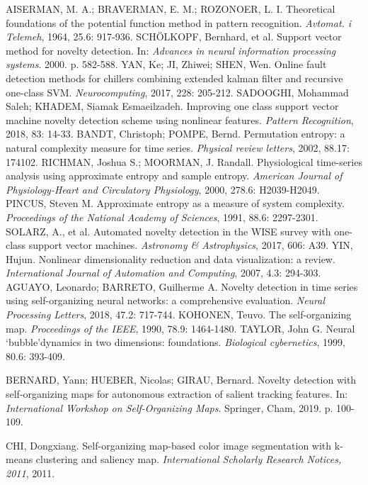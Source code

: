 \documentclass[11pt,twoside,openright]{report}
\begin{document}
\begin{thebibliography}{L}
AISERMAN, M. A.; BRAVERMAN, E. M.; ROZONOER, L. I. Theoretical foundations of the potential function method in pattern recognition. \textit{Avtomat. i Telemeh}, 1964, 25.6: 917-936.
SCHÖLKOPF, Bernhard, et al. Support vector method for novelty detection. In: \textit{Advances in neural information processing systems}. 2000. p. 582-588.
YAN, Ke; JI, Zhiwei; SHEN, Wen. Online fault detection methods for chillers combining extended kalman filter and recursive one-class SVM. \textit{Neurocomputing}, 2017, 228: 205-212.
SADOOGHI, Mohammad Saleh; KHADEM, Siamak Esmaeilzadeh. Improving one class support vector machine novelty detection scheme using nonlinear features. \textit{Pattern Recognition}, 2018, 83: 14-33.
BANDT, Christoph; POMPE, Bernd. Permutation entropy: a natural complexity measure for time series. \textit{Physical review letters}, 2002, 88.17: 174102.
RICHMAN, Joshua S.; MOORMAN, J. Randall. Physiological time-series analysis using approximate entropy and sample entropy. \textit{American Journal of Physiology-Heart and Circulatory Physiology}, 2000, 278.6: H2039-H2049.
PINCUS, Steven M. Approximate entropy as a measure of system complexity. \textit{Proceedings of the National Academy of Sciences}, 1991, 88.6: 2297-2301.
SOLARZ, A., et al. Automated novelty detection in the WISE survey with one-class support vector machines. \textit{Astronomy \& Astrophysics}, 2017, 606: A39.
YIN, Hujun. Nonlinear dimensionality reduction and data visualization: a review. \textit{International Journal of Automation and Computing}, 2007, 4.3: 294-303.
AGUAYO, Leonardo; BARRETO, Guilherme A. Novelty detection in time series using self-organizing neural networks: a comprehensive evaluation. \textit{Neural Processing Letters}, 2018, 47.2: 717-744.
KOHONEN, Teuvo. The self-organizing map. \textit{Proceedings of the IEEE}, 1990, 78.9: 1464-1480.
TAYLOR, John G. Neural ‘bubble’dynamics in two dimensions: foundations. \textit{Biological cybernetics}, 1999, 80.6: 393-409.

BERNARD, Yann; HUEBER, Nicolas; GIRAU, Bernard. Novelty detection with self-organizing maps for autonomous extraction of salient tracking features. In: \textit{International Workshop on Self-Organizing Maps}. Springer, Cham, 2019. p. 100-109.

CHI, Dongxiang. Self-organizing map-based color image segmentation with k-means clustering and saliency map. \textit{International Scholarly Research Notices, 2011}, 2011.


\end{thebibliography}
\end{document}
